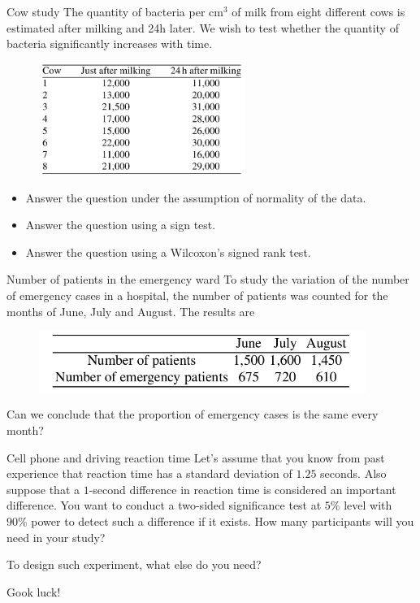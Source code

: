 \documentclass{beamer}
\begin{document}
\begin{frame}{Cow study}
The quantity of bacteria per $\text{cm}^3$ of milk from eight different cows is estimated after milking and 24h later. We wish to test whether the quantity of bacteria significantly increases with time.
\begin{figure}
\centering
\includegraphics[width=0.6\textwidth]{cow-study.png}
\end{figure}
\begin{itemize}
\item Answer the question under the assumption of normality of the data.
\item Answer the question using a sign test.
\item Answer the question using a Wilcoxon's signed rank test.
\end{itemize}
\end{frame}

\begin{frame}{Number of patients in the emergency ward}
To study the variation of the number of emergency cases in a hospital, the number of patients was counted for the months of June, July and August. The results are
\begin{figure}
\centering
\includegraphics[width=0.95\textwidth]{num-patients.png}
\end{figure}
Can we conclude that the proportion of emergency cases is the same every month?

\end{frame}

\begin{frame}{Cell phone and driving reaction time}
Let's assume that you know from past experience that reaction time has a standard deviation of $1.25$ seconds. Also suppose that a $1$-second difference in reaction time is considered an important difference. You want to conduct a two-sided significance test at $5\%$ level with $90\%$ power to detect such a difference if it exists. How many participants will you need in your study?

To design such experiment, what else do you need?
\end{frame}

\begin{frame}
  \Huge{Gook luck!}
  \end{frame}
\end{document}
